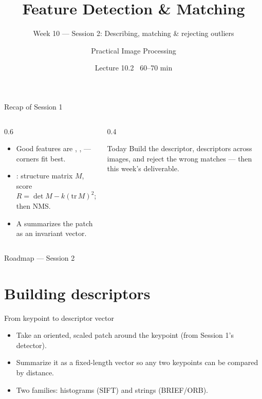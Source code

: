 \documentclass[10pt,aspectratio=169]{beamer}
\title{Feature Detection \& Matching}
\subtitle{Week 10 — Session 2: Describing, matching \& rejecting outliers}
\author{Practical Image Processing}
\date{Lecture 10.2 \textbullet\ 60--70 min}
\begin{document}
\maketitle

\begin{frame}{Recap of Session 1}
  \begin{columns}[T]
    \begin{column}{0.6\textwidth}
      \begin{itemize}
        \item Good features are , ,  — corners fit best.
        \item {}: structure matrix $M$, score $R=\det M - k(\mathrm{tr}\,M)^2$; then NMS.
        \item A  summarizes the patch as an invariant vector.
      \end{itemize}
    \end{column}
    \begin{column}{0.4\textwidth}
      \begin{alertblock}{Today}
        Build the descriptor,  descriptors across images, and reject the wrong matches —
        then this week's deliverable.
      \end{alertblock}
    \end{column}
  \end{columns}
\end{frame}

\begin{frame}{Roadmap — Session 2}\tableofcontents\end{frame}

\section{Building descriptors}

\begin{frame}{From keypoint to descriptor vector}
  \begin{itemize}
    \item Take an oriented, scaled patch around the keypoint (from Session 1's detector).
    \item Summarize it as a fixed-length vector so any two keypoints can be compared by distance.
    \item Two families:  histograms (SIFT) and  strings (BRIEF/ORB).
  \end{itemize}
\end{frame}
\end{document}
